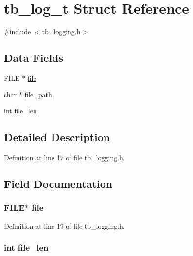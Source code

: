\hypertarget{structtb__log__t}{\section{tb\-\_\-log\-\_\-t Struct Reference}
\label{structtb__log__t}
}


{\ttfamily \#include $<$tb\-\_\-logging.\-h$>$}

\subsection*{Data Fields}
\begin{DoxyCompactItemize}
\item 
F\-I\-L\-E $\ast$ \hyperlink{structtb__log__t_a702945180aa732857b380a007a7e2a21}{file}
\item 
char $\ast$ \hyperlink{structtb__log__t_a19064fd51f3a2b4b3c6e8ac8c09850c2}{file\-\_\-path}
\item 
int \hyperlink{structtb__log__t_a40c07165efeb9ce3aff7ce4c4d02af26}{file\-\_\-len}
\end{DoxyCompactItemize}


\subsection{Detailed Description}


Definition at line 17 of file tb\-\_\-logging.\-h.



\subsection{Field Documentation}
\hypertarget{structtb__log__t_a702945180aa732857b380a007a7e2a21}{
\subsubsection[{file}]{\setlength{\rightskip}{0pt plus 5cm}F\-I\-L\-E$\ast$ file}}\label{structtb__log__t_a702945180aa732857b380a007a7e2a21}


Definition at line 19 of file tb\-\_\-logging.\-h.

\hypertarget{structtb__log__t_a40c07165efeb9ce3aff7ce4c4d02af26}{
\subsubsection[{file\-\_\-len}]{\setlength{\rightskip}{0pt plus 5cm}int file\-\_\-len}}\label{structtb__log__t_a40c07165efeb9ce3aff7ce4c4d02af26}


